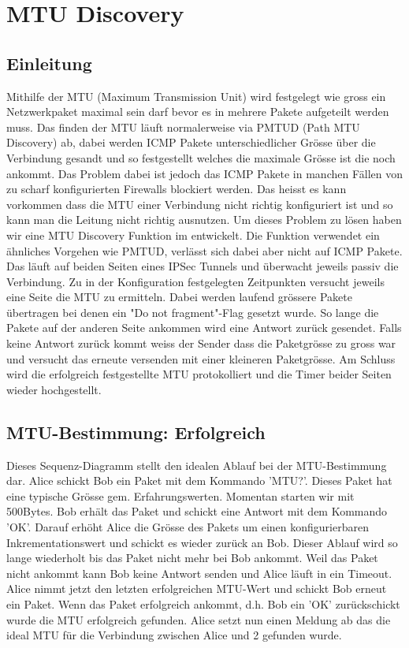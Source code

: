 \section{MTU Discovery}
\label{sec:MTU Discovery}

\subsection{Einleitung}
Mithilfe der \acs{MTU} (Maximum Transmission Unit) wird festgelegt wie gross ein Netzwerkpaket maximal sein darf bevor es in mehrere Pakete aufgeteilt werden muss. Das finden der MTU läuft normalerweise via \acs{PMTUD} (Path MTU Discovery) ab, dabei werden \acs{ICMP} Pakete unterschiedlicher Grösse über die Verbindung gesandt und so festgestellt welches die maximale Grösse ist die noch ankommt. Das Problem dabei ist jedoch das ICMP Pakete in manchen Fällen von zu scharf konfigurierten Firewalls blockiert werden. Das heisst es kann vorkommen dass die MTU einer Verbindung nicht richtig konfiguriert ist und so kann man die Leitung nicht richtig ausnutzen. Um dieses Problem zu lösen haben wir eine \acs{MTU} Discovery Funktion im \tool entwickelt. Die Funktion verwendet ein ähnliches Vorgehen wie \acs{PMTUD}, verlässt sich dabei aber nicht auf \acs{ICMP} Pakete.
Das \tool läuft auf beiden Seiten eines \acs{IPSec} Tunnels und überwacht jeweils passiv die Verbindung. Zu in der Konfiguration festgelegten Zeitpunkten versucht jeweils eine Seite die \acs{MTU} zu ermitteln. Dabei werden laufend grössere Pakete übertragen bei denen ein "Do not fragment"-Flag gesetzt wurde. %
So lange die Pakete auf der anderen Seite ankommen wird eine Antwort zurück gesendet. Falls keine Antwort zurück kommt weiss der Sender dass die Paketgrösse zu gross war und versucht das erneute versenden mit einer kleineren Paketgrösse.
Am Schluss wird die erfolgreich festgestellte \acs{MTU} protokolliert und die Timer beider Seiten wieder hochgestellt.

\subsection{MTU-Bestimmung: Erfolgreich}
Dieses Sequenz-Diagramm stellt den idealen Ablauf bei der MTU-Bestimmung dar. Alice schickt Bob ein Paket mit dem Kommando 'MTU?'. Dieses Paket hat eine typische Grösse gem. Erfahrungswerten. Momentan starten wir mit 500Bytes. %
Bob erhält das Paket und schickt eine Antwort mit dem Kommando 'OK'. Darauf erhöht Alice
die Grösse des Pakets um einen konfigurierbaren Inkrementationswert und schickt es wieder zurück an
Bob. Dieser Ablauf wird so lange wiederholt bis das Paket nicht mehr bei Bob ankommt.
Weil das Paket nicht ankommt kann Bob keine Antwort senden und Alice läuft in ein Timeout.
Alice nimmt jetzt den letzten erfolgreichen MTU-Wert und schickt Bob erneut ein Paket.
Wenn das Paket erfolgreich ankommt, d.h. Bob ein 'OK' zurückschickt wurde die MTU erfolgreich gefunden. Alice setzt nun einen Meldung ab das die ideal MTU für die Verbindung zwischen Alice und 2 gefunden wurde.

